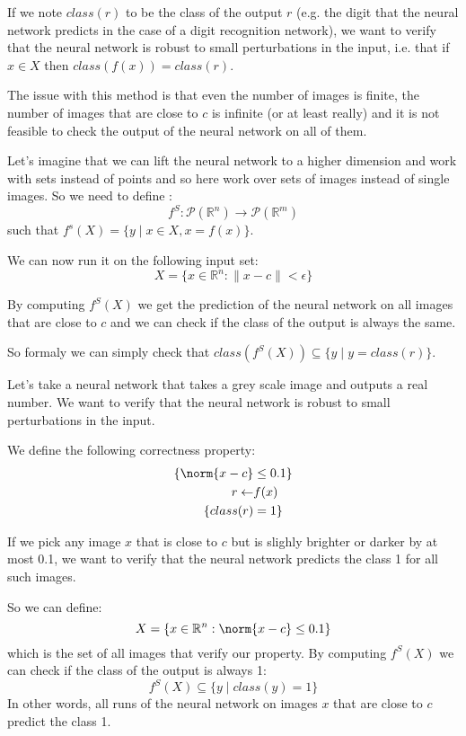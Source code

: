 \documentclass{article}
\begin{document}
If we note \(class(r) \) to be the class of the output \(r \) (e.g. the digit that the neural network predicts in the case of a digit recognition network), we want to verify that the neural network is robust to small perturbations in the input, i.e. that if \(x \in X \) then \(class(f(x)) = class(r) \).

The issue with this method is that even the number of images is finite, the number of images that are close to \(c \) is infinite (or at least really) and it is not feasible to check the output of the neural network on all of them.

Let's imagine that we can lift the neural network to a higher dimension and work with sets instead of points and so here work over sets of images instead of single images.
So we need to define : 
\[f^S: \mathcal{P}( \mathbb{R}^n) \to \mathcal{P}( \mathbb{R}^m)\] such that $f^s(X) = \{y \mid x \in X, x = f(x)\}$.

We can now run it on the following input set: 
\[X = \{x \in \mathbb{R}^n : \|x - c\| < \epsilon \} \]

By computing \(f^S(X) \) we get the prediction of the neural network on all images that are close to \(c \) and we can check if the class of the output is always the same.

So formaly we can simply check that \(class(f^S(X)) \subseteq \{ y \mid y = class(r) \} \).

\begin{example}
    Let's take a neural network that takes a grey scale image and outputs a real number. We want to verify that the neural network is robust to small perturbations in the input.

    We define the following correctness property: 
    \begin{align*}
        \{ \norm{x - c} &\leq 0.1 \} \\
        r \leftarrow& f(x) \\
        \{ class(r) &= 1 \}
    \end{align*}

    If we pick any image \(x \) that is close to \(c \) but is slighly brighter or darker by at most 0.1, we want to verify that the neural network predicts the class 1 for all such images.

    So we can define:
    \[
        X = \{x \in \mathbb{R}^n : \norm{x - c} \leq 0.1 \}
    \]
    which is the set of all images that verify our property.
    By computing \(f^S(X) \) we can check if the class of the output is always 1:
    \[ f^S(X) \subseteq \{y \mid class(y) = 1 \} \]
    In other words, all runs of the neural network on images \(x \) that are close to \(c \) predict the class 1.
\end{example}
\end{document}

